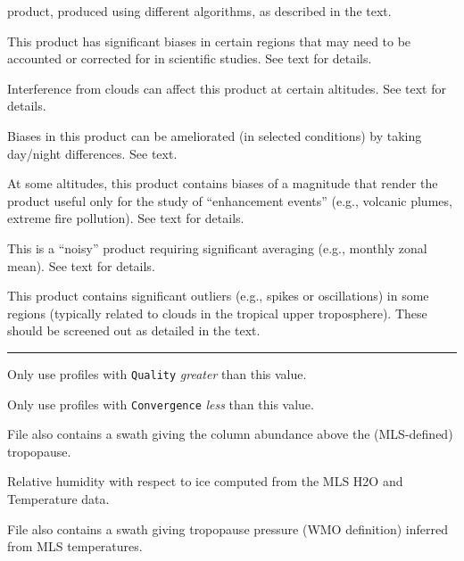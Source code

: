 \documentclass[11pt,draft]{report}
\begin{document}
\begin{table}
{\begin{tablenotes}
    product, produced using different algorithms, as described in the text.
  \item[B] This product has significant biases in certain regions
    that may need to be accounted or corrected for in scientific studies.
    See text for details.
  \item[C] Interference from clouds can affect this product at certain
    altitudes. See text for details.
  \item[D] Biases in this product can be ameliorated (in selected
    conditions) by taking day/night differences.  See text.
  \item[E] At some altitudes, this product contains biases of a magnitude
    that render the product useful only for the study of ``enhancement
    events'' (e.g., volcanic plumes, extreme fire pollution).  See text
    for details.
  \end{tablenotes}}%
\hfill\parbox[t]{0.5\textwidth-0.5\columnsep}{\footnotesize\sffamily
  \begin{tablenotes}
  \item[N] This is a ``noisy'' product requiring significant averaging
    (e.g., monthly zonal mean).  See text for details.
  \item[O] This product contains significant outliers (e.g., spikes or
    oscillations) in some regions (typically related to clouds in the
    tropical upper troposphere).  These should be screened out as detailed
    in the text.
  \end{tablenotes}
  \vspace{-1ex}\rule{\linewidth}{0.5pt}\par
  \vspace{-0.5ex}\begin{tablenotes}
  \item[\mbox{[1]}] Only use profiles with \texttt{Quality} \emph{greater}
    than this value.
  \item[\mbox{[2]}] Only use profiles with \texttt{Convergence} \emph{less} than this value.
  \item[\mbox{[3]}] File also contains a swath giving the column
    abundance above the (MLS-defined) tropopause.
  \item[\mbox{[4]}] Relative humidity with respect to ice computed from the
    MLS H\cs2O and Temperature data.
  \item[\mbox{[5]}] File also contains a swath giving tropopause
    pressure (WMO definition) inferred from MLS temperatures.
  \end{tablenotes}}

\end{table}
\end{document}
